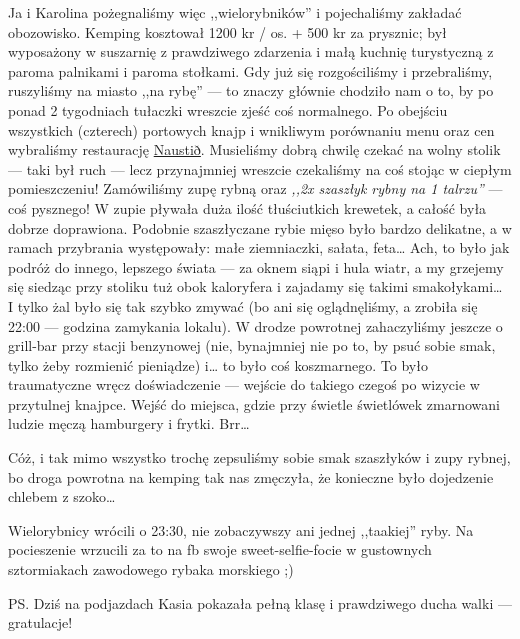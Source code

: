 
Ja i Karolina pożegnaliśmy więc ,,wielorybników'' i pojechaliśmy zakładać obozowisko. Kemping kosztował 1200 kr / os. + 500 kr za prysznic; był wyposażony w suszarnię z prawdziwego zdarzenia i małą kuchnię turystyczną z paroma palnikami i paroma stołkami. Gdy już się rozgościliśmy i przebraliśmy, ruszyliśmy na miasto ,,na rybę'' --- to znaczy głównie chodziło nam o to, by po ponad 2 tygodniach tułaczki wreszcie zjeść coś normalnego. Po obejściu wszystkich (czterech) portowych knajp i wnikliwym porównaniu menu oraz cen wybraliśmy restaurację \href{https://www.facebook.com/naustid}{Naustið}. Musieliśmy dobrą chwilę czekać na wolny stolik --- taki był ruch --- lecz przynajmniej wreszcie czekaliśmy na coś stojąc w ciepłym pomieszczeniu! Zamówiliśmy zupę rybną oraz \emph{,,2x szaszłyk rybny na 1 talrzu''} --- coś pysznego! W zupie pływała duża ilość tłuściutkich krewetek, a całość była dobrze doprawiona. Podobnie szaszłyczane rybie mięso było bardzo delikatne, a w ramach przybrania występowały: małe ziemniaczki, sałata, feta… Ach, to było jak podróż do innego, lepszego świata --- za oknem siąpi i hula wiatr, a my grzejemy się siedząc przy stoliku tuż obok kaloryfera i zajadamy się takimi smakołykami… I tylko żal było się tak szybko zmywać (bo ani się oglądnęliśmy, a zrobiła się 22:00 --- godzina zamykania lokalu). W drodze powrotnej zahaczyliśmy jeszcze o grill-bar przy stacji benzynowej (nie, bynajmniej nie po to, by psuć sobie smak, tylko żeby rozmienić pieniądze) i… to było coś koszmarnego. To było traumatyczne wręcz doświadczenie --- wejście do takiego czegoś po wizycie w przytulnej knajpce. Wejść do miejsca, gdzie przy świetle świetlówek zmarnowani ludzie męczą hamburgery i frytki. Brr…


Cóż, i tak mimo wszystko trochę zepsuliśmy sobie smak szaszłyków i zupy rybnej, bo droga powrotna na kemping tak nas zmęczyła, że konieczne było dojedzenie chlebem z szoko…

Wielorybnicy wrócili o 23:30, nie zobaczywszy ani jednej ,,taakiej'' ryby. Na pocieszenie wrzucili za to na fb swoje sweet-selfie-focie w gustownych sztormiakach zawodowego rybaka morskiego ;)

PS. Dziś na podjazdach Kasia pokazała pełną klasę i prawdziwego ducha walki --- gratulacje!
